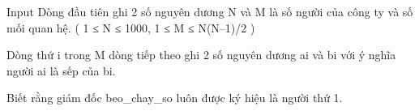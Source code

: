 Input
Dòng đầu tiên ghi 2 số nguyên dương N và M là số người của công ty và số mối quan hệ. ( 1 ≤ N ≤ 1000, 1 ≤ M ≤ N(N–1)/2 )  

   Dòng thứ i trong M dòng tiếp theo ghi 2 số nguyên dương ai và bi với ý nghĩa người ai là sếp của bi.  

   Biết rằng giám đốc beo\_chay\_so luôn được ký hiệu là người thứ 1.